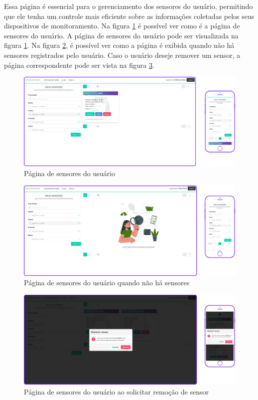 \documentclass[tcc,capa]{texufpel}
\begin{document}
Essa página é essencial para o gerenciamento dos sensores do usuário, permitindo que ele tenha um controle mais eficiente sobre as informações coletadas pelos seus dispositivos de monitoramento. Na figura \ref{meusensores} é possível ver como é a página de sensores do usuário. A página de sensores do usuário pode ser visualizada na figura \ref{meusensores}. Na figura \ref{meusensoresnull}, é possível ver como a página é exibida quando não há sensores registrados pelo usuário. Caso o usuário deseje remover um sensor, a página correspondente pode ser vista na figura \ref{meusensoresremove}. 
\begin{figure}[htbp]
  \centering \includegraphics[scale=.2]{assets/meusensores.png}
  \caption{Página de sensores do usuário}
  \label{meusensores}
\end{figure}

\begin{figure}[htbp]
  \centering \includegraphics[scale=.2]{assets/meussensoresnull.png}
  \caption{Página de sensores do usuário quando não há sensores}
  \label{meusensoresnull}
\end{figure}

\begin{figure}[htbp]
  \centering \includegraphics[scale=.2]{assets/meusensoresremover.png}
  \caption{Página de sensores do usuário ao solicitar remoção de sensor}
  \label{meusensoresremove}
\end{figure}
\newpage
\end{document}
